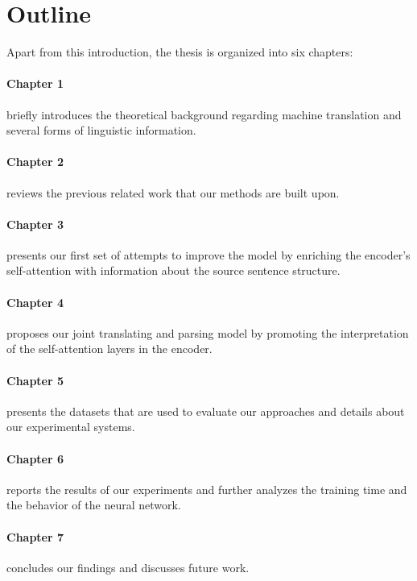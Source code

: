 \section*{Outline}

Apart from this introduction, the thesis is organized into six chapters:

\paragraph{Chapter 1} briefly introduces the theoretical background regarding machine translation and several forms of linguistic information.
\paragraph{Chapter 2} reviews the previous related work that our methods are built upon.
\paragraph{Chapter 3} presents our first set of attempts to improve the \transformer model by enriching the encoder's self-attention with information about the source sentence structure.
\paragraph{Chapter 4} proposes our joint translating and parsing model by promoting the interpretation of the self-attention layers in the encoder.
\paragraph{Chapter 5} presents the datasets that are used to evaluate our approaches and details about our experimental systems.
\paragraph{Chapter 6} reports the results of our experiments and further analyzes the training time and the behavior of the neural network.
\paragraph{Chapter 7} concludes our findings and discusses future work.
